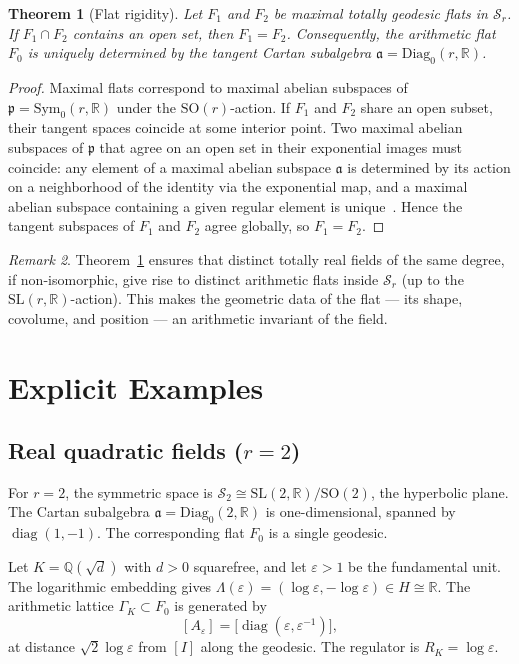 \documentclass[12pt]{article}
\newtheorem{theorem}{Theorem}[section]
\theoremstyle{definition}
\theoremstyle{remark}
\newtheorem{remark}[theorem]{Remark}
\newcommand{\R}{\mathbb{R}}
\newcommand{\Q}{\mathbb{Q}}
\newcommand{\SL}{\mathrm{SL}}
\newcommand{\SO}{\mathrm{SO}}
\newcommand{\Symz}{\mathrm{Sym}_{0}}
\newcommand{\Diagz}{\mathrm{Diag}_{0}}
\newcommand{\calM}{\mathcal{S}}
\newcommand{\diag}{\operatorname{diag}}
\begin{document}
\begin{theorem}[Flat rigidity]
\label{thm:rigidity}
Let $F_1$ and $F_2$ be maximal totally geodesic flats in $\calM_r$.
If $F_1 \cap F_2$ contains an open set, then $F_1 = F_2$.
Consequently, the arithmetic flat $F_0$ is uniquely determined by the
tangent Cartan subalgebra $\mathfrak{a} = \Diagz(r,\R)$.
\end{theorem}

\begin{proof}
Maximal flats correspond to maximal abelian subspaces
of $\mathfrak{p} = \Symz(r,\R)$
under the $\SO(r)$-action.
If $F_1$ and $F_2$ share an open subset,
their tangent spaces coincide at some interior point.
Two maximal abelian subspaces of $\mathfrak{p}$ that agree on
an open set in their exponential images must coincide:
any element of a maximal abelian subspace $\mathfrak{a}$
is determined by its action on a neighborhood of the identity
via the exponential map, and a maximal abelian subspace containing
a given regular element is unique~\cite[Ch.~V, Thm.~6.2]{Helgason}.
Hence the tangent subspaces of $F_1$ and $F_2$ agree globally,
so $F_1 = F_2$.
\end{proof}

\begin{remark}
Theorem~\ref{thm:rigidity} ensures that distinct totally real fields
of the same degree, if non-isomorphic, give rise to distinct arithmetic
flats inside $\calM_r$ (up to the $\SL(r,\R)$-action).
This makes the geometric data of the flat — its shape, covolume, and
position — an arithmetic invariant of the field.
\end{remark}

\section{Explicit Examples}
\label{sec:examples}

\subsection{Real quadratic fields ($r = 2$)}

For $r = 2$, the symmetric space is $\calM_2 \cong \SL(2,\R)/\SO(2)$,
the hyperbolic plane.
The Cartan subalgebra $\mathfrak{a} = \Diagz(2,\R)$ is one-dimensional,
spanned by $\diag(1,-1)$.
The corresponding flat $F_0$ is a single geodesic.

Let $K = \Q(\sqrt{d})$ with $d > 0$ squarefree, and let
$\varepsilon > 1$ be the fundamental unit.
The logarithmic embedding gives
$\Lambda(\varepsilon) = (\log\varepsilon, -\log\varepsilon) \in H \cong \R$.
The arithmetic lattice $\Gamma_K \subset F_0$ is generated by
\[
  [A_\varepsilon] = \bigl[\diag(\varepsilon, \varepsilon^{-1})\bigr],
\]
at distance $\sqrt{2}\log\varepsilon$ from $[I]$ along the geodesic.
The regulator is $R_K = \log\varepsilon$.
\end{document}
